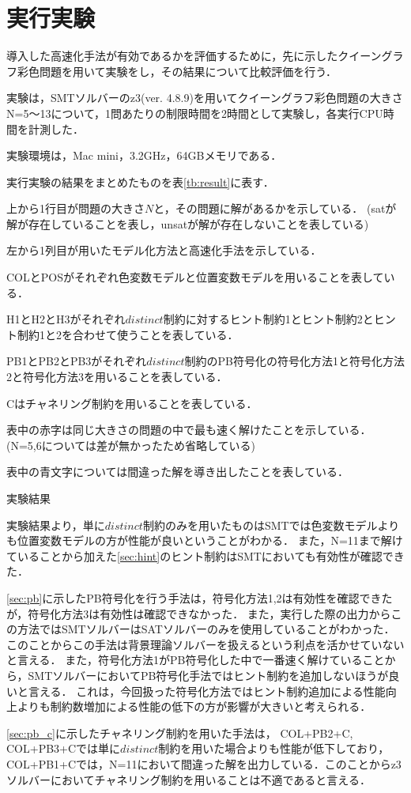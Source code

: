\chapter{実行実験}

導入した高速化手法が有効であるかを評価するために，先に示したクイーングラフ彩色問題を用いて実験をし，その結果について比較評価を行う．

実験は，SMTソルバーのz3(ver. 4.8.9)を用いてクイーングラフ彩色問題の大きさN=5〜13について，1問あたりの制限時間を2時間として実験し，各実行CPU時間を計測した．

実験環境は，Mac mini，3.2GHz，64GBメモリである．

実行実験の結果をまとめたものを表\ref{tb:result}に表す．

上から1行目が問題の大きさ$N$と，その問題に解があるかを示している．
(satが解が存在していることを表し，unsatが解が存在しないことを表している)

左から1列目が用いたモデル化方法と高速化手法を示している．

COLとPOSがそれぞれ色変数モデルと位置変数モデルを用いることを表している．

H1とH2とH3がそれぞれ$distinct$制約に対するヒント制約1とヒント制約2とヒント制約1と2を合わせて使うことを表している．

PB1とPB2とPB3がそれぞれ$distinct$制約のPB符号化の符号化方法1と符号化方法2と符号化方法3を用いることを表している．

Cはチャネリング制約を用いることを表している．

表中の赤字は同じ大きさの問題の中で最も速く解けたことを示している．
(N=5,6については差が無かったため省略している)

表中の青文字については間違った解を導き出したことを表している．
\begin{table}[htb]
    \caption{実験結果}
{\tiny \label{tb:result}}
\end{table}

実験結果より，単に$distinct$制約のみを用いたものはSMTでは色変数モデルよりも位置変数モデルの方が性能が良いということがわかる．
また，N=11まで解けていることから加えた\ref{sec:hint}のヒント制約はSMTにおいても有効性が確認できた．

\ref{sec:pb}に示したPB符号化を行う手法は，符号化方法1,2は有効性を確認できたが，符号化方法3は有効性は確認できなかった．
また，実行した際の出力からこの方法ではSMTソルバーはSATソルバーのみを使用していることがわかった．
このことからこの手法は背景理論ソルバーを扱えるという利点を活かせていないと言える．
また，符号化方法1がPB符号化した中で一番速く解けていることから，SMTソルバーにおいてPB符号化手法ではヒント制約を追加しないほうが良いと言える．
これは，今回扱った符号化方法ではヒント制約追加による性能向上よりも制約数増加による性能の低下の方が影響が大きいと考えられる．

\ref{sec:pb_c}に示したチャネリング制約を用いた手法は，
COL+PB2+C, COL+PB3+Cでは単に$distinct$制約を用いた場合よりも性能が低下しており，
COL+PB1+Cでは，N=11において間違った解を出力している．このことからz3ソルバーにおいてチャネリング制約を用いることは不適であると言える．


